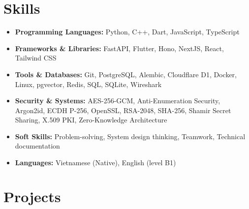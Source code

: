 \documentclass[10pt,a4paper]{article}
\begin{document}
\section*{Skills}
\begin{itemize}[leftmargin=0.15in, label={}, itemsep=0pt]
    \item \textbf{Programming Languages:} Python, C++, Dart, JavaScript, TypeScript
    \item \textbf{Frameworks \& Libraries:} FastAPI, Flutter, Hono, NextJS, React, Tailwind CSS
    \item \textbf{Tools \& Databases:} Git, PostgreSQL, Alembic, Cloudflare D1, Docker, Linux, pgvector, Redis, SQL, SQLite, Wireshark
    \item \textbf{Security \& Systems:} AES-256-GCM, Anti-Enumeration Security, Argon2id, ECDH P-256, OpenSSL, RSA-2048, SHA-256, Shamir Secret Sharing, X.509 PKI, Zero-Knowledge Architecture
    \item \textbf{Soft Skills:} Problem-solving, System design thinking, Teamwork, Technical documentation
    \item \textbf{Languages:} Vietnamese (Native), English (level B1)
\end{itemize}

\section*{Projects}
\end{document}
